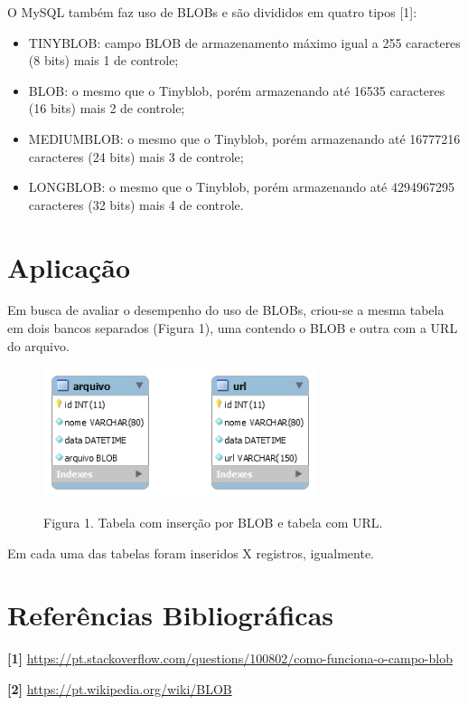 \documentclass[12pt,a4paper]{article}
\begin{document}
O MySQL também faz uso de BLOBs e são divididos em quatro tipos [1]:
\begin{itemize}
	\item TINYBLOB: campo BLOB de armazenamento máximo igual a 255 caracteres (8 bits) mais 1 de controle;
	\item BLOB: o mesmo que o Tinyblob, porém armazenando até 16535 caracteres (16 bits) mais 2 de controle;
	\item MEDIUMBLOB: o mesmo que o Tinyblob, porém armazenando até 16777216 caracteres (24 bits) mais 3 de controle;
	\item LONGBLOB: o mesmo que o Tinyblob, porém armazenando até 4294967295 caracteres (32 bits) mais 4 de controle.
\end{itemize}

\section{Aplicação}
Em busca de avaliar o desempenho do uso de BLOBs, criou-se a mesma tabela em dois bancos separados (Figura 1), uma contendo o BLOB e outra com a URL do arquivo.

\begin{figure}[htb]
	\label{figura:tabelas}
	\centering
	\includegraphics[width=8cm]{recursos/imagens/tabelas.png} 
	
	Figura 1. Tabela com inserção por BLOB e tabela com URL.
\end{figure}

Em cada uma das tabelas foram inseridos X registros, igualmente. 


%



%

%


\section{Referências Bibliográficas}
\noindent \textbf{[1]} \url {https://pt.stackoverflow.com/questions/100802/como-funciona-o-campo-blob}\\\vspace{0.2cm}

\noindent \textbf{[2] }\url{https://pt.wikipedia.org/wiki/BLOB}\\\vspace{0.2cm}
\end{document}

